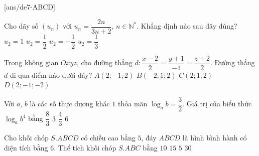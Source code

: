 \begin{name}
	{\tenchude}
	{\tendethi}
	{\tentruong}
	{\thoigian}
	\end{name}
\TN
{}[ans/de7-ABCD]
\begin{ex}%
	Cho dãy số $(u_n)$ với $u_n=\dfrac{2n}{3n+2}$, $n\in\mathbb{N}^*$. Khẳng định nào sau đây đúng?\vspace{3pt}
	\choice
	{$u_2=1$}
	{\True $u_2=\dfrac{1}{2}$}
	{$u_2=-\dfrac{1}{2}$}
	{$u_2=\dfrac{1}{3}$}
\end{ex}
\begin{ex}%
	Trong không gian $Oxyz$, cho đường thẳng $d\colon\dfrac{x-2}{2}=\dfrac{y+1}{-1}=\dfrac{z+2}{2}$. Đường thẳng $d$ đi qua điểm nào dưới đây?
	\choice
	{$A(2;-1;2)$}
	{$B(-2;1;2)$}
	{$C(2;1;2)$}
	{\True $D(2;-1;-2)$}
\end{ex}
\begin{ex}%
	Với $a$, $b$ là các số thực dương khác $1$ thỏa mãn $\log_a b=\dfrac{3}{2}$. Giá trị của biểu thức $\log_a b^4$ bằng\vspace{3pt}
	\choice
	{$\dfrac{8}{3}$}
	{$3$}
	{$\dfrac{4}{3}$}
	{\True $6$}
\end{ex}
\begin{ex}%
	Cho khối chóp $S.ABCD$ có chiều cao bằng $5$, đáy $ABCD$ là hình bình hành có diện tích bằng $6$. Thể tích khối chóp $S.ABC$ bằng
	\choice
	{$10$}
	{$15$}
	{\True $5$}
	{$30$}
\end{ex}
